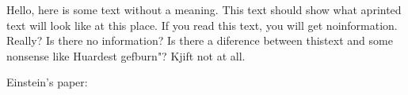 \documentclass[../main.tex]{subfiles}
\begin{document}
 

Hello, here is some text without a meaning. This text should show what aprinted text will look like at this place. If you read this text, you will get noinformation. Really? Is there no information? Is there a diference between thistext and some nonsense like Huardest gefburn"? Kjift not at all.

Einstein's paper: \cite{Einstein}
\end{document}
